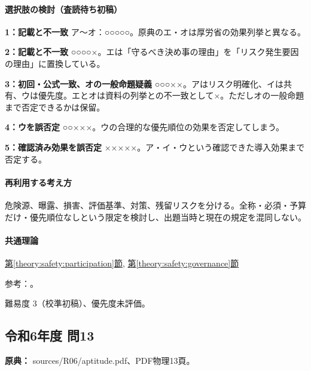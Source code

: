 \paragraph{選択肢の検討（査読待ち初稿）}\mbox{}\par

\noindent\textbf{1：記載と不一致} ア〜オ：○○○○○。原典のエ・オは厚労省の効果列挙と異なる。\par

\noindent\textbf{2：記載と不一致} ○○○○×。エは「守るべき決め事の理由」を「リスク発生要因の理由」に置換している。\par

\noindent\textbf{3：初回・公式一致、オの一般命題疑義} ○○○××。アはリスク明確化、イは共有、ウは優先度。エとオは資料の列挙との不一致として×。ただしオの一般命題まで否定できるかは保留。\par

\noindent\textbf{4：ウを誤否定} ○○×××。ウの合理的な優先順位の効果を否定してしまう。\par

\noindent\textbf{5：確認済み効果を誤否定} ×××××。ア・イ・ウという確認できた導入効果まで否定する。\par

\paragraph{再利用する考え方} 危険源、曝露、損害、評価基準、対策、残留リスクを分ける。全称・必須・予算だけ・優先順位なしという限定を検討し、出題当時と現在の規定を混同しない。

\paragraph{共通理論} \hyperref[theory:safety:participation]{第\ref*{theory:safety:participation}節}, \hyperref[theory:safety:governance]{第\ref*{theory:safety:governance}節}

\par 参考：\cite{saf_ra_effects,saf_ra2006,saf_chem2016}。

\par 難易度 3（校準初稿）、優先度未評価。

\subsection{令和6年度 問13}
\label{q:r06-reg-apt-13}

\noindent\textbf{原典：} sources/R06/aptitude.pdf、PDF物理13頁。

